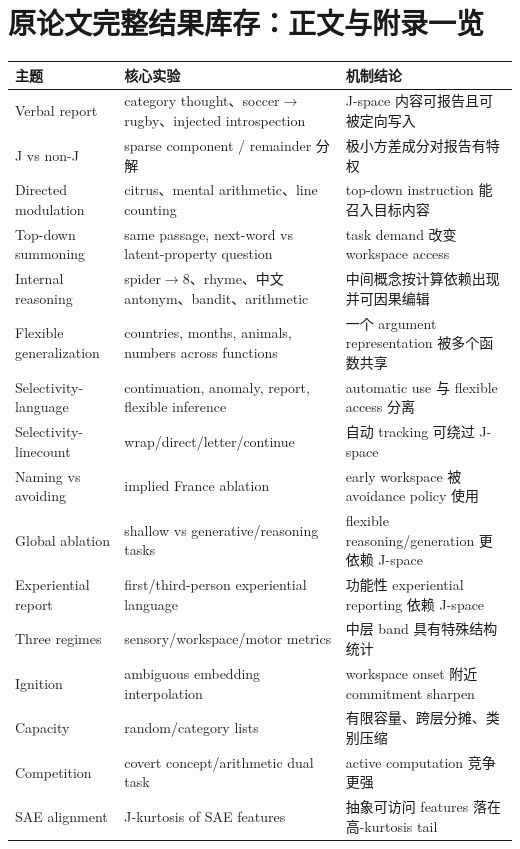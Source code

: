 \documentclass[10.5pt,a4paper]{ctexart}
\begin{document}
\section{原论文完整结果库存：正文与附录一览}
\begin{longtable}{p{}p{}p{}}
\toprule
主题 & 核心实验 & 机制结论 \\
\midrule
Verbal report & category thought、soccer$\to$rugby、injected introspection & J-space 内容可报告且可被定向写入 \\
J vs non-J & sparse component / remainder 分解 & 极小方差成分对报告有特权 \\
Directed modulation & citrus、mental arithmetic、line counting & top-down instruction 能召入目标内容 \\
Top-down summoning & same passage, next-word vs latent-property question & task demand 改变 workspace access \\
Internal reasoning & spider$\to$8、rhyme、中文 antonym、bandit、arithmetic & 中间概念按计算依赖出现并可因果编辑 \\
Flexible generalization & countries, months, animals, numbers across functions & 一个 argument representation 被多个函数共享 \\
Selectivity-language & continuation, anomaly, report, flexible inference & automatic use 与 flexible access 分离 \\
Selectivity-linecount & wrap/direct/letter/continue & 自动 tracking 可绕过 J-space \\
Naming vs avoiding & implied France ablation & early workspace 被 avoidance policy 使用 \\
Global ablation & shallow vs generative/reasoning tasks & flexible reasoning/generation 更依赖 J-space \\
Experiential report & first/third-person experiential language & 功能性 experiential reporting 依赖 J-space \\
Three regimes & sensory/workspace/motor metrics & 中层 band 具有特殊结构统计 \\
Ignition & ambiguous embedding interpolation & workspace onset 附近 commitment sharpen \\
Capacity & random/category lists & 有限容量、跨层分摊、类别压缩 \\
Competition & covert concept/arithmetic dual task & active computation 竞争更强 \\
SAE alignment & J-kurtosis of SAE features & 抽象可访问 features 落在高-kurtosis tail \\

\end{longtable}
\end{document}
